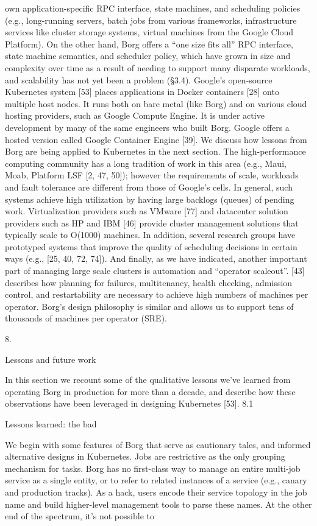 own application-specific RPC interface, state machines, and
scheduling policies (e.g., long-running servers, batch jobs
from various frameworks, infrastructure services like cluster storage systems, virtual machines from the Google Cloud
Platform). On the other hand, Borg offers a “one size fits all”
RPC interface, state machine semantics, and scheduler policy, which have grown in size and complexity over time as a
result of needing to support many disparate workloads, and
scalability has not yet been a problem (§3.4).
Google’s open-source Kubernetes system [53] places
applications in Docker containers [28] onto multiple host
nodes. It runs both on bare metal (like Borg) and on various
cloud hosting providers, such as Google Compute Engine.
It is under active development by many of the same engineers who built Borg. Google offers a hosted version called
Google Container Engine [39]. We discuss how lessons from
Borg are being applied to Kubernetes in the next section.
The high-performance computing community has a long
tradition of work in this area (e.g., Maui, Moab, Platform
LSF [2, 47, 50]); however the requirements of scale, workloads and fault tolerance are different from those of Google’s
cells. In general, such systems achieve high utilization by
having large backlogs (queues) of pending work.
Virtualization providers such as VMware [77] and datacenter solution providers such as HP and IBM [46] provide
cluster management solutions that typically scale to O(1000)
machines. In addition, several research groups have prototyped systems that improve the quality of scheduling decisions in certain ways (e.g., [25, 40, 72, 74]).
And finally, as we have indicated, another important part
of managing large scale clusters is automation and “operator
scaleout”. [43] describes how planning for failures, multitenancy, health checking, admission control, and restartability are necessary to achieve high numbers of machines per
operator. Borg’s design philosophy is similar and allows us
to support tens of thousands of machines per operator (SRE).

8.

Lessons and future work

In this section we recount some of the qualitative lessons
we’ve learned from operating Borg in production for more
than a decade, and describe how these observations have
been leveraged in designing Kubernetes [53].
8.1

Lessons learned: the bad

We begin with some features of Borg that serve as cautionary
tales, and informed alternative designs in Kubernetes.
Jobs are restrictive as the only grouping mechanism
for tasks. Borg has no first-class way to manage an entire
multi-job service as a single entity, or to refer to related
instances of a service (e.g., canary and production tracks).
As a hack, users encode their service topology in the job
name and build higher-level management tools to parse these
names. At the other end of the spectrum, it’s not possible to

